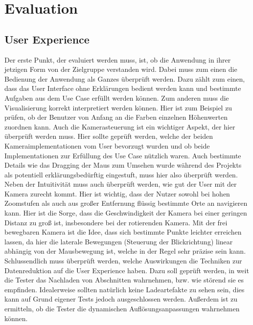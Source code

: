 \chapter{Evaluation}

\section{User Experience}
Der erste Punkt, der evaluiert werden muss, ist, ob die Anwendung in ihrer jetzigen Form von der Zielgruppe verstanden wird. Dabei muss zum einen die Bedienung der Anwendung als Ganzes überprüft werden. Dazu zählt zum einen, dass das User Interface ohne Erklärungen bedient werden kann und bestimmte Aufgaben aus dem Use Case erfüllt werden können. Zum anderen muss die Visualisierung korrekt interpretiert werden können. Hier ist zum Beispiel zu prüfen, ob der Benutzer von Anfang an die Farben einzelnen Höhenwerten zuordnen kann. Auch die Kamerasteuerung ist ein wichtiger Aspekt, der hier überprüft werden muss. Hier sollte geprüft werden, welche der beiden Kameraimplementationen vom User bevorzugt wurden und ob beide Implementationen zur Erfüllung des Use Case nützlich waren. Auch bestimmte Details wie das Dragging der Maus zum Umsehen wurde während des Projekts als potentiell erklärungsbedürftig eingestuft, muss hier also überprüft werden. Neben der Intuitivität muss auch überprüft werden, wie gut der User mit der Kamera zurecht kommt. Hier ist wichtig, dass der Nutzer sowohl bei hohen Zoomstufen als auch aus großer Entfernung flüssig bestimmte Orte an navigieren kann. Hier ist die Sorge, dass die Geschwindigkeit der Kamera bei einer geringen Distanz zu groß ist, insbesondere bei der rotierenden Kamera. Mit der frei bewegbaren Kamera ist die Idee, dass sich bestimmte Punkte leichter erreichen lassen, da hier die laterale Bewegungen (Steuerung der Blickrichtung) linear abhängig von der Mausbewegung ist, welche in der Regel sehr präzise sein kann. Schlussendlich muss überprüft werden, welche Auswirkungen die Techniken zur Datenreduktion auf die User Experience haben. Dazu soll geprüft werden, in weit die Tester das Nachladen von Abschnitten wahrnehmen, bzw. wie störend sie es empfinden. Idealerweise sollten natürlich keine Ladeartefakte zu sehen sein, dies kann auf Grund eigener Tests jedoch ausgeschlossen werden. Außerdem ist zu ermitteln, ob die Tester die dynamischen Auflösungsanpassungen wahrnehmen können.

